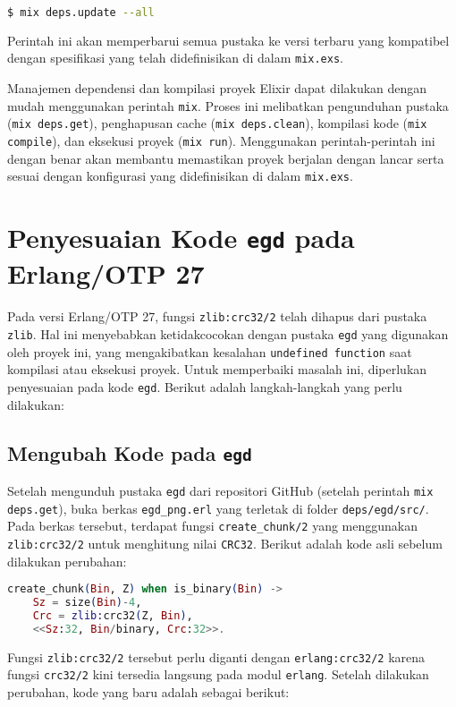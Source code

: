 \begin{lstlisting}[language=bash]
	$ mix deps.update --all
\end{lstlisting}

Perintah ini akan memperbarui semua pustaka ke versi terbaru yang kompatibel dengan spesifikasi yang telah didefinisikan di dalam \texttt{mix.exs}.

Manajemen dependensi dan kompilasi proyek Elixir dapat dilakukan dengan mudah menggunakan perintah \texttt{mix}. Proses ini melibatkan pengunduhan pustaka (\texttt{mix deps.get}), penghapusan cache (\texttt{mix deps.clean}), kompilasi kode (\texttt{mix compile}), dan eksekusi proyek (\texttt{mix run}). Menggunakan perintah-perintah ini dengan benar akan membantu memastikan proyek berjalan dengan lancar serta sesuai dengan konfigurasi yang didefinisikan di dalam \texttt{mix.exs}.


\section{Penyesuaian Kode \texttt{egd} pada Erlang/OTP 27}

Pada versi Erlang/OTP 27, fungsi \texttt{zlib:crc32/2} telah dihapus dari pustaka \texttt{zlib}. Hal ini menyebabkan ketidakcocokan dengan pustaka \texttt{egd} yang digunakan oleh proyek ini, yang mengakibatkan kesalahan \texttt{undefined function} saat kompilasi atau eksekusi proyek. Untuk memperbaiki masalah ini, diperlukan penyesuaian pada kode \texttt{egd}. Berikut adalah langkah-langkah yang perlu dilakukan:

\subsection{Mengubah Kode pada \texttt{egd}}

Setelah mengunduh pustaka \texttt{egd} dari repositori GitHub (setelah perintah \texttt{mix deps.get}), buka berkas \texttt{egd\_png.erl} yang terletak di folder \texttt{deps/egd/src/}. Pada berkas tersebut, terdapat fungsi \texttt{create\_chunk/2} yang menggunakan \texttt{zlib:crc32/2} untuk menghitung nilai \texttt{CRC32}. Berikut adalah kode asli sebelum dilakukan perubahan:

\begin{lstlisting}[language=Elixir]
	create_chunk(Bin, Z) when is_binary(Bin) ->
	Sz = size(Bin)-4,
	Crc = zlib:crc32(Z, Bin),
	<<Sz:32, Bin/binary, Crc:32>>.
\end{lstlisting}

Fungsi \texttt{zlib:crc32/2} tersebut perlu diganti dengan \texttt{erlang:crc32/2} karena fungsi \texttt{crc32/2} kini tersedia langsung pada modul \texttt{erlang}. Setelah dilakukan perubahan, kode yang baru adalah sebagai berikut:

